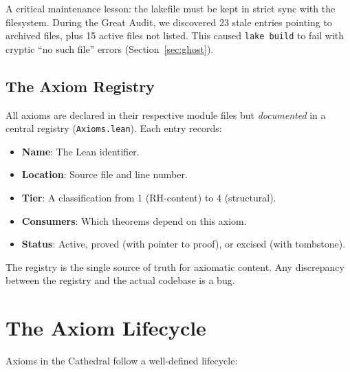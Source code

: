 \documentclass[11pt,a4paper]{article}
\theoremstyle{definition}
\newcommand{\lean}[1]{\texttt{#1}}
\begin{document}
A critical maintenance lesson: the lakefile must be kept in strict
sync with the filesystem. During the Great Audit, we discovered 23
stale entries pointing to archived files, plus 15 active files not
listed. This caused \texttt{lake build} to fail with cryptic
``no such file'' errors (Section~\ref{sec:ghost}).

\subsection{The Axiom Registry}

All axioms are declared in their respective module files but
\emph{documented} in a central registry (\lean{Axioms.lean}).
Each entry records:

\begin{itemize}
  \item \textbf{Name}: The Lean identifier.
  \item \textbf{Location}: Source file and line number.
  \item \textbf{Tier}: A classification from 1 (RH-content) to
    4 (structural).
  \item \textbf{Consumers}: Which theorems depend on this axiom.
  \item \textbf{Status}: Active, proved (with pointer to proof), or
    excised (with tombstone).
\end{itemize}

The registry is the single source of truth for axiomatic content.
Any discrepancy between the registry and the actual codebase is a
bug.

\section{The Axiom Lifecycle}
\label{sec:axiom-lifecycle}

Axioms in the Cathedral follow a well-defined lifecycle:

\begin{center}
\end{center}
\end{document}
